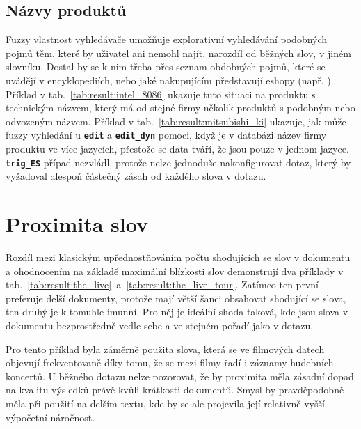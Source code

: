 \documentclass[11pt,letterpaper,oneside,openright]{book}
\newcommand{\bftt}[1]{\texttt{\textbf{#1}}}
\begin{document}
\subsection{Názvy produktů}

\mbox{}\mbox{}

Fuzzy vlastnost vyhledávače umožňuje explorativní vyhledávání podobných pojmů
těm, které by uživatel ani nemohl najít, narozdíl od běžných slov, v jiném
slovníku. Dostal by se k nim třeba přes seznam obdobných pojmů, které se
uvádějí v encyklopediích, nebo jaké nakupujícím představují eshopy (např.
). Příklad v tab.~\ref{tab:result:intel_8086}
ukazuje tuto situaci na produktu s technickým názvem, který má od stejné firmy
několik produktů s podobným nebo odvozeným názvem. Příklad v
tab.~\ref{tab:result:mitsubishi_ki} ukazuje, jak může fuzzy vyhledání u
\bftt{edit} a \bftt{edit\_dyn} pomoci, když je v databázi název firmy produktu
ve více jazycích, přestože se data tváří, že jsou pouze v jednom jazyce.
\bftt{trig\_ES} případ nezvládl, protože nelze jednoduše nakonfigurovat dotaz,
který by vyžadoval alespoň částečný zásah od každého slova v dotazu.

\mbox{}\mbox{}




\section{Proximita slov}
Rozdíl mezi klasickým upřednostňováním počtu shodujících se slov v
dokumentu a ohodnocením na základě maximální blízkosti slov demonstrují
dva příklady v
tab.~\ref{tab:result:the_live}~a~\ref{tab:result:the_live_tour}. Zatímco
ten první preferuje delší dokumenty, protože mají větší šanci obsahovat
shodující se slova, ten druhý je k tomuhle imunní. Pro něj je ideální
shoda taková, kde jsou slova v dokumentu bezprostředně vedle sebe a ve
stejném pořadí jako v dotazu.

Pro tento příklad byla záměrně použita slova, která se ve filmových datech
objevují frekventovaně díky tomu, že se mezi filmy řadí i záznamy hudebních
koncertů. U běžného dotazu nelze pozorovat, že by proximita měla zásadní dopad
na kvalitu výsledků právě kvůli krátkosti dokumentů. Smysl by pravděpodobně
měla při použití na delším textu, kde by se ale projevila její relativně vyšší
výpočetní náročnost.


\mbox{}\mbox{}
\end{document}
